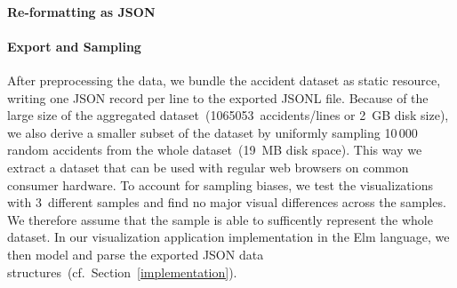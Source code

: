 \paragraph{Re-formatting as JSON}


\paragraph{Export and Sampling}

After preprocessing the data, we bundle the accident dataset as static resource, writing one JSON record per line to the exported JSONL file. Because of the large size of the aggregated dataset~(1065053~accidents/lines or 2~GB disk size), we also derive a smaller subset of the dataset by uniformly sampling 10\,000 random accidents from the whole dataset~(19~MB disk space). This way we extract a dataset that can be used with regular web browsers on common consumer hardware.
To account for sampling biases, we test the visualizations with 3~different samples and find no major visual differences across the samples. We therefore assume that the sample is able to sufficently represent the whole dataset. In our visualization application implementation in the Elm language, we then model and parse the exported JSON data structures~(cf.~Section~\ref{implementation}).

